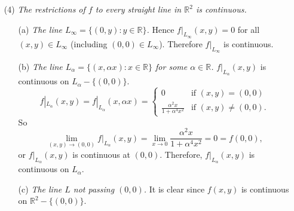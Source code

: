 \documentclass{article}
\begin{document}
\begin{enumerate}
\item[(4)]
\emph{The restrictions of $f$ to every straight line
in $\mathbb{R}^2$ is continuous.}
  \begin{enumerate}
  \item[(a)]
  \emph{The line $L_{\infty} = \{(0,y) : y \in \mathbb{R} \}$.}
  Hence $f|_{L_{\infty}}(x,y) = 0$ for all $(x,y) \in L_{\infty}$
  (including $(0,0) \in L_{\infty}$).
  Therefore $f|_{L_{\infty}}$ is continuous.
  \item[(b)]
  \emph{The line $L_{\alpha} = \{(x,\alpha x) : x \in \mathbb{R} \}$
  for some $\alpha \in \mathbb{R}$.}
  $f|_{L_{\alpha}}(x,y)$ is continuous on $L_{\alpha} - \{(0,0)\}$.
  \begin{equation*}
    f|_{L_{\alpha}}(x,y) =
    f|_{L_{\alpha}}(x,\alpha x) =
    \begin{cases}
      0                                   & \text{if $(x,y) = (0,0)$} \\
      \frac{\alpha^2 x}{1 + \alpha^4 x^2} & \text{if $(x,y) \neq (0,0)$}.
    \end{cases}
  \end{equation*}
  So
  \[
    \lim_{(x,y) \to (0,0)} f|_{L_{\alpha}}(x,y)
    = \lim_{x \to 0} \frac{\alpha^2 x}{1 + \alpha^4 x^2}
    = 0
    = f(0,0),
  \]
  or $f|_{L_{\alpha}}(x,y)$ is continuous at $(0,0)$.
  Therefore, $f|_{L_{\alpha}}(x,y)$ is continuous on $L_{\alpha}$.
  \item[(c)]
  \emph{The line $L$ not passing $(0,0)$.}
  It is clear since $f(x,y)$ is continuous on $\mathbb{R}^2 - \{(0,0)\}$.
  \end{enumerate}


\end{enumerate}
\end{document}
